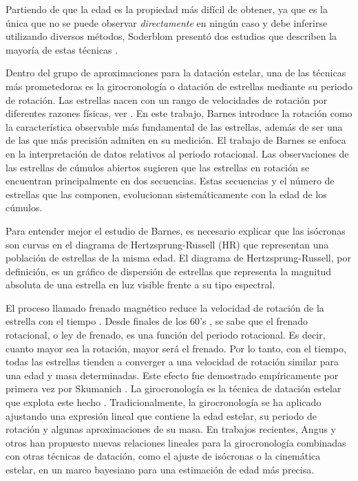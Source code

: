 Partiendo de que la edad es la propiedad más difícil de obtener, ya que es la única que no se puede observar \emph{directamente} en ningún caso y debe inferirse utilizando diversos métodos, Soderblom presentó dos estudios que describen la mayoría de estas técnicas \cite{Soderblom15, Soderblom10}.

Dentro del grupo de aproximaciones para la datación estelar, una de las técnicas más prometedoras es la girocronología o datación de estrellas mediante su periodo de rotación. Las estrellas nacen con un rango de velocidades de rotación por diferentes razones físicas, ver \cite{Barnes03}. En este trabajo, Barnes introduce la rotación como la característica observable más fundamental de las estrellas, además de ser una de las que más precisión admiten en su medición. El trabajo de Barnes se enfoca en la interpretación de datos relativos al periodo rotacional. Las observaciones de las estrellas de cúmulos abiertos sugieren que las estrellas en rotación se encuentran principalmente en dos secuencias. Estas secuencias y el número de estrellas que las componen, evolucionan sistemáticamente con la edad de los cúmulos.

Para entender mejor el estudio de Barnes, es necesario explicar que las isócronas son curvas en el diagrama de Hertzsprung-Russell (HR) que representan una población de estrellas de la misma edad. El diagrama de Hertzsprung-Russell, por definición, es un gráfico de dispersión de estrellas que representa la magnitud absoluta de una estrella en luz visible frente a su tipo espectral.

El proceso llamado frenado magnético reduce la velocidad de rotación de la estrella con el tiempo \cite{Schatzman62}. Desde finales de los 60's \cite{Belcher76, Kawaler88, Mestel68, Mestel87, Weber67}, se sabe que el frenado rotacional, o ley de frenado, es una función del periodo rotacional. Es decir, cuanto mayor sea la rotación, mayor será el frenado. Por lo tanto, con el tiempo, todas las estrellas tienden a converger a una velocidad de rotación similar para una edad y masa determinadas. Este efecto fue demostrado empíricamente por primera vez por Skumanich \cite{Skumanich72}. La girocronología es la técnica de datación estelar que explota este hecho \cite{Barnes16, Soderblom15}. Tradicionalmente, la girocronología se ha aplicado ajustando una expresión lineal que contiene la edad estelar, su periodo de rotación y algunas aproximaciones de su masa. En trabajos recientes, Angus y otros \cite{Angus20} \cite{Angus19} han propuesto nuevas relaciones lineales para la girocronología combinadas con otras técnicas de datación, como el ajuste de isócronas o la cinemática estelar, en un marco bayesiano para una estimación de edad más precisa. 

